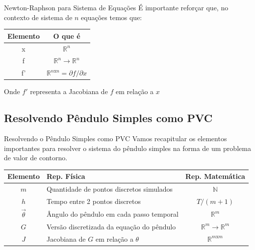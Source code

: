 \documentclass[11pt]{beamer}
\begin{document}
\begin{frame}{Newton-Raphson para Sistema de Equações}
    É importante reforçar que, no contexto de sistema de $n$ equações temos que:

    \begin{table}[]
        \centering
        \begin{tabular}{|c|c|}
            \hline
            Elemento & O que é \\
            \hline
            x & $\mathbb R^n$ \\
            f & $\mathbb R^n\to \mathbb R^n$ \\
            f' & $\mathbb R^{n\text{x}n} = \partial f/\partial x$ \\
            \hline
        \end{tabular}
    \end{table}

    Onde $f'$ representa a Jacobiana de $f$ em relação a $x$
\end{frame}

\subsection{Resolvendo Pêndulo Simples como PVC}

\begin{frame}{Resolvendo o Pêndulo Simples como PVC}
    Vamos recapitular os elementos importantes para resolver o sistema do pêndulo simples na forma de um problema de valor de contorno.

    \begin{table}[]
        \centering
        \begin{tabular}{|c|p{5cm}|c|}
            \hline
            Elemento & Rep. Física & Rep. Matemática \\
            \hline
            \hline
            $m$ & Quantidade de pontos discretos simulados & $\mathbb N$ \\
            \hline
            $h$ & Tempo entre 2 pontos discretos & $T/(m+1)$ \\
            \hline
            $\vec\theta$ & Ângulo do pêndulo em cada passo temporal & $\mathbb R^m$ \\
            \hline
            $G$ & Versão discretizada da equação do pêndulo & $\mathbb R^m \to \mathbb R^m$ \\
            \hline
            $J$ & Jacobiana de $G$ em relação a $\theta$ & $\mathbb R^{m\text{x}m}$ \\
            \hline
        \end{tabular}
        \label{tab:placeholder}
    \end{table}
\end{frame}
\end{document}
